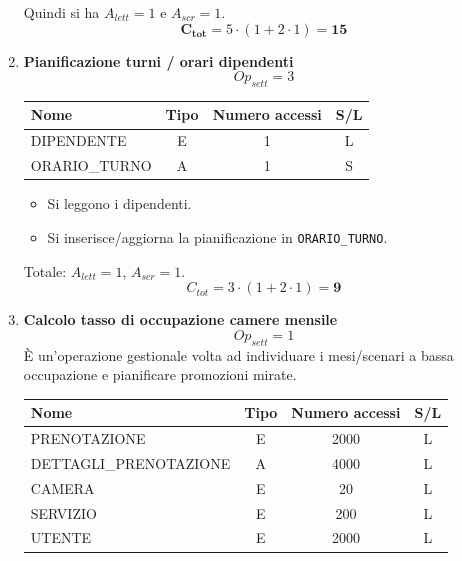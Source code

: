 \documentclass[a4paper,12pt]{report}
\begin{document}
\begin{enumerate}
	      Quindi si ha $A_{lett}=1$ e $A_{scr}=1$.
	      $$\mathbf{C_{tot}} = 5 \cdot (1 + 2 \cdot 1) = \mathbf{15}$$

	\item {\large \textbf{Pianificazione turni / orari dipendenti}} \label{op18}
	      $$
		      Op_{sett} = 3
	      $$

	      \begin{table}[H]
		      \centering
		      \small
		      \renewcommand{\arraystretch}{1.15}
		      \begin{tabularx}{0.8\textwidth}{|X|c|c|c|}
			      \hline
			      \rowcolor{gray!20}
			      \textbf{Nome} & \textbf{Tipo} & \textbf{Numero accessi} & \textbf{S/L} \\
			      \hline
			      DIPENDENTE    & E             & 1                       & L            \\
			      ORARIO\_TURNO & A             & 1                       & S            \\
			      \hline
		      \end{tabularx}
	      \end{table}

	      \begin{itemize}
		      \item Si leggono i dipendenti.
		      \item Si inserisce/aggiorna la pianificazione in \texttt{ORARIO\_TURNO}.
	      \end{itemize}

	      Totale: $A_{lett}=1$, $A_{scr}=1$.
	      $$C_{tot} = 3 \cdot (1 + 2 \cdot 1) = \mathbf{9}$$


	\item {\large \textbf{Calcolo tasso di occupazione camere mensile}} \label{op19}
	      $$
		      {Op}_{sett} = 1
	      $$
	      È un'operazione gestionale volta ad individuare i mesi/scenari a bassa occupazione e pianificare promozioni mirate.

	      \begin{table}[H]
		      \centering
		      \small
		      \renewcommand{\arraystretch}{1.15}
		      \begin{tabularx}{0.8\textwidth}{|X|c|c|c|}
			      \hline
			      \rowcolor{gray!20}
			      \textbf{Nome}          & \textbf{Tipo} & \textbf{Numero accessi} & \textbf{S/L} \\
			      \hline
			      PRENOTAZIONE           & E             & 2000                    & L            \\
			      DETTAGLI\_PRENOTAZIONE & A             & 4000                    & L            \\
			      CAMERA                 & E             & 20                      & L            \\
			      SERVIZIO               & E             & 200                     & L            \\
			      UTENTE                 & E             & 2000                    & L            \\
			      \hline
		      \end{tabularx}
	      \end{table}


\end{enumerate}
\end{document}
